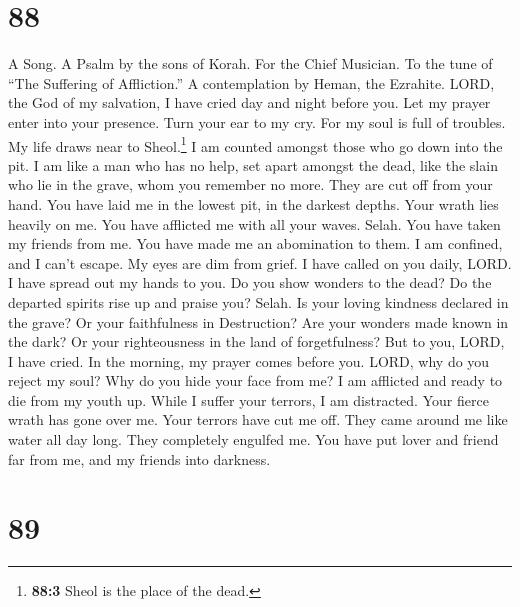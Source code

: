 \hypertarget{section-80}{%
\section{88}\label{section-80}}

A Song. A Psalm by the sons of Korah. For the Chief Musician. To the
tune of ``The Suffering of Affliction.'' A contemplation by Heman, the
Ezrahite.  LORD, the God of my salvation, I have cried day
and night before you.  Let my prayer enter into your
presence. Turn your ear to my cry.  For my soul is full of
troubles. My life draws near to Sheol.\footnote{\textbf{88:3} Sheol is
  the place of the dead.}  I am counted amongst those who
go down into the pit. I am like a man who has no help, 
set apart amongst the dead, like the slain who lie in the grave, whom
you remember no more. They are cut off from your hand. 
You have laid me in the lowest pit, in the darkest depths.
 Your wrath lies heavily on me. You have afflicted me with
all your waves. Selah.  You have taken my friends from me.
You have made me an abomination to them. I am confined, and I can't
escape.  My eyes are dim from grief. I have called on you
daily, LORD. I have spread out my hands to you.  Do you
show wonders to the dead? Do the departed spirits rise up and praise
you? Selah.  Is your loving kindness declared in the
grave? Or your faithfulness in Destruction?  Are your
wonders made known in the dark? Or your righteousness in the land of
forgetfulness?  But to you, LORD, I have cried. In the
morning, my prayer comes before you.  LORD, why do you
reject my soul? Why do you hide your face from me?  I am
afflicted and ready to die from my youth up. While I suffer your
terrors, I am distracted.  Your fierce wrath has gone
over me. Your terrors have cut me off.  They came around
me like water all day long. They completely engulfed me. 
You have put lover and friend far from me, and my friends into darkness.

\hypertarget{section-81}{%
\section{89}\label{section-81}}

